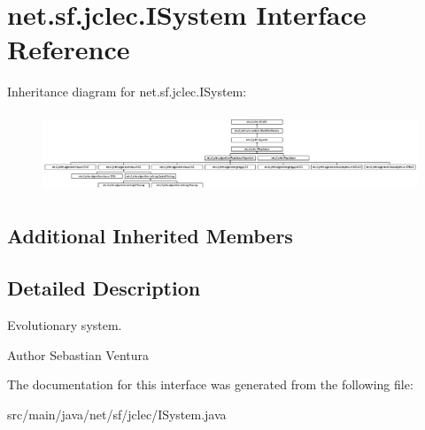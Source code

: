 \hypertarget{interfacenet_1_1sf_1_1jclec_1_1_i_system}{\section{net.\-sf.\-jclec.\-I\-System Interface Reference}
\label{interfacenet_1_1sf_1_1jclec_1_1_i_system}
}
Inheritance diagram for net.\-sf.\-jclec.\-I\-System\-:\begin{figure}[H]
\begin{center}
\leavevmode
\includegraphics[height=2.397004cm]{interfacenet_1_1sf_1_1jclec_1_1_i_system}
\end{center}
\end{figure}
\subsection*{Additional Inherited Members}


\subsection{Detailed Description}
Evolutionary system.

\begin{DoxyAuthor}{Author}
Sebastian Ventura 
\end{DoxyAuthor}


The documentation for this interface was generated from the following file\-:\begin{DoxyCompactItemize}
\item 
src/main/java/net/sf/jclec/I\-System.\-java\end{DoxyCompactItemize}
